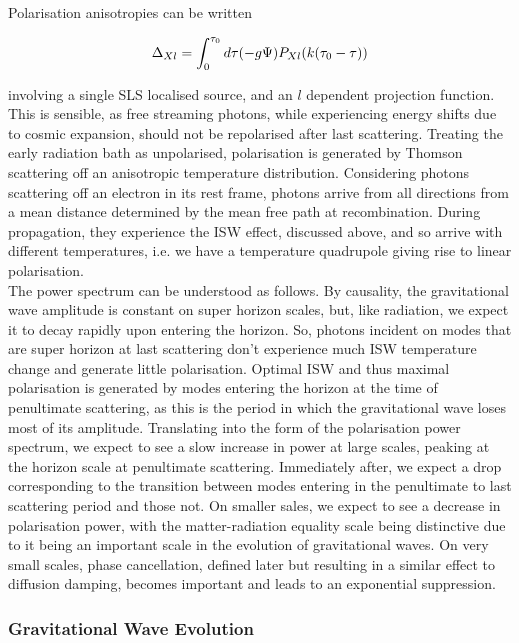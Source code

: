 \documentclass[a4paper,10pt]{article}
\begin{document}
Polarisation anisotropies can be written

\begin{equation}
\Delta_{Xl} = \int_0^{\tau_0} d\tau (-g\Psi) P_{Xl}(k(\tau_0-\tau))\\
\end{equation}

involving a single SLS localised source, and an $l$ dependent projection function. This is sensible, as free streaming photons, while experiencing energy shifts due to cosmic expansion, should not be repolarised after last scattering. Treating the early radiation bath as unpolarised, polarisation is generated by Thomson scattering off an anisotropic temperature distribution. Considering photons scattering off an electron in its rest frame, photons arrive from all directions from a mean distance determined by the mean free path at recombination. During propagation, they experience the ISW effect, discussed above, and so arrive with different temperatures, i.e. we have a temperature quadrupole giving rise to linear polarisation. \\

The power spectrum can be understood as follows. By causality, the gravitational wave amplitude is constant on super horizon scales, but, like radiation, we expect it to decay rapidly upon entering the horizon. So, photons incident on modes that are super horizon at last scattering don't experience much ISW temperature change and generate little polarisation. Optimal ISW and thus maximal polarisation is generated by modes entering the horizon at the time of penultimate scattering, as this is the period in which the gravitational wave loses most of its amplitude. Translating into the form of the polarisation power spectrum, we expect to see a slow increase in power at large scales, peaking at the horizon scale at penultimate scattering. Immediately after, we expect a drop corresponding to the transition between modes entering in the penultimate to last scattering period and those not. On smaller sales, we expect to see a decrease in polarisation power, with the matter-radiation equality scale being distinctive due to it being an important scale in the evolution of gravitational waves. On very small scales, phase cancellation, defined later but resulting in a similar effect to diffusion damping, becomes important and leads to an exponential suppression. 

\subsubsection{Gravitational Wave Evolution}
\label{evolution}
\end{document}
